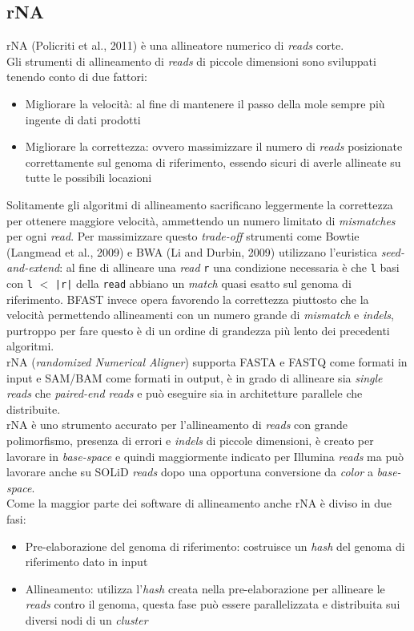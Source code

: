 \documentclass[conference]{IEEEtran}
\begin{document}
	\subsection{rNA}
	rNA (Policriti et al., 2011) è una allineatore numerico di \textit{reads} corte.\\
	Gli strumenti di allineamento di \textit{reads} di piccole dimensioni sono sviluppati tenendo conto di due fattori:
	\begin{itemize}
		\item Migliorare la velocità: al fine di mantenere il passo della mole sempre più ingente di dati prodotti
		\item Migliorare la correttezza: ovvero massimizzare il numero di \textit{reads} posizionate correttamente sul genoma di riferimento, essendo sicuri di averle allineate su tutte le possibili locazioni
	\end{itemize}
	Solitamente gli algoritmi di allineamento sacrificano leggermente la correttezza per ottenere maggiore velocità, ammettendo un numero limitato di \textit{mismatches} per ogni \textit{read}. Per massimizzare questo \textit{trade-off} strumenti come Bowtie (Langmead et al., 2009) e BWA (Li and Durbin, 2009) utilizzano l'euristica \textit{seed-and-extend}: al fine di allineare una \textit{read} \texttt{r} una condizione necessaria è che \texttt{l} basi con \texttt{l} $<$ \texttt{|r|} della \texttt{read} abbiano un \textit{match} quasi esatto sul genoma di riferimento. BFAST invece opera favorendo la correttezza piuttosto che la velocità permettendo allineamenti con un numero grande di \textit{mismatch} e \textit{indels}, purtroppo per fare questo è di un ordine di grandezza più lento dei precedenti algoritmi.\\

rNA (\textit{randomized Numerical Aligner}) supporta FASTA e FASTQ come formati in input e SAM/BAM come formati in output, è in grado di allineare sia \textit{single reads} che \textit{paired-end reads} e può eseguire sia in architetture parallele che distribuite.\\

rNA è uno strumento accurato per l'allineamento di \textit{reads} con grande polimorfismo, presenza di errori e \textit{indels} di piccole dimensioni, è creato per lavorare in \textit{base-space} e quindi maggiormente indicato per Illumina \textit{reads} ma può lavorare anche su SOLiD \textit{reads} dopo una opportuna conversione da \textit{color} a \textit{base-space}.\\
Come la maggior parte dei software di allineamento anche rNA è diviso in due fasi:
	\begin{itemize}
		\item Pre-elaborazione del genoma di riferimento: costruisce un \textit{hash} del genoma di riferimento dato in input
		\item Allineamento: utilizza l'\textit{hash} creata nella pre-elaborazione per allineare le \textit{reads} contro il genoma, questa fase può essere parallelizzata e distribuita sui diversi nodi di un \textit{cluster}\\
	\end{itemize}
\end{document}
